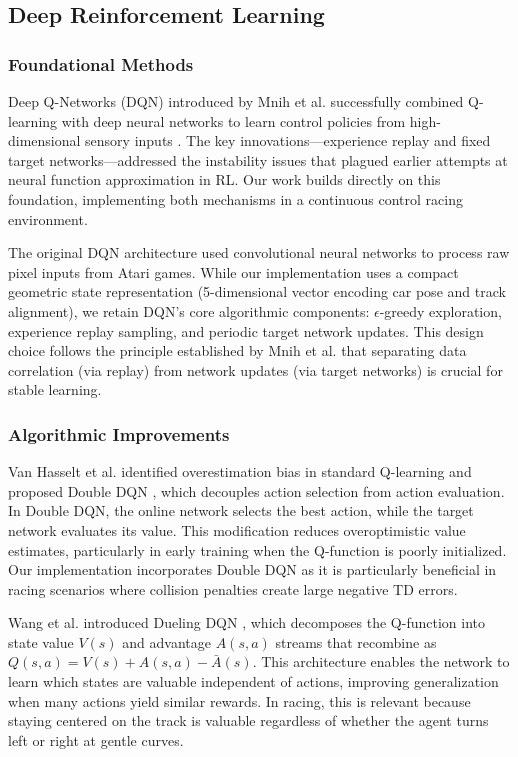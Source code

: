 \subsection{Deep Reinforcement Learning}

\subsubsection{Foundational Methods}

Deep Q-Networks (DQN) introduced by Mnih et al. successfully combined Q-learning with deep neural networks to learn control policies from high-dimensional sensory inputs \cite{mnih2013playing, mnih2015human}. The key innovations—experience replay and fixed target networks—addressed the instability issues that plagued earlier attempts at neural function approximation in RL. Our work builds directly on this foundation, implementing both mechanisms in a continuous control racing environment.

The original DQN architecture used convolutional neural networks to process raw pixel inputs from Atari games. While our implementation uses a compact geometric state representation (5-dimensional vector encoding car pose and track alignment), we retain DQN's core algorithmic components: $\epsilon$-greedy exploration, experience replay sampling, and periodic target network updates. This design choice follows the principle established by Mnih et al. that separating data correlation (via replay) from network updates (via target networks) is crucial for stable learning.

\subsubsection{Algorithmic Improvements}

Van Hasselt et al. identified overestimation bias in standard Q-learning and proposed Double DQN \cite{van2016deep}, which decouples action selection from action evaluation. In Double DQN, the online network selects the best action, while the target network evaluates its value. This modification reduces overoptimistic value estimates, particularly in early training when the Q-function is poorly initialized. Our implementation incorporates Double DQN as it is particularly beneficial in racing scenarios where collision penalties create large negative TD errors.

Wang et al. introduced Dueling DQN \cite{wang2016dueling}, which decomposes the Q-function into state value $V(s)$ and advantage $A(s,a)$ streams that recombine as $Q(s,a) = V(s) + A(s,a) - \bar{A}(s)$. This architecture enables the network to learn which states are valuable independent of actions, improving generalization when many actions yield similar rewards. In racing, this is relevant because staying centered on the track is valuable regardless of whether the agent turns left or right at gentle curves.

